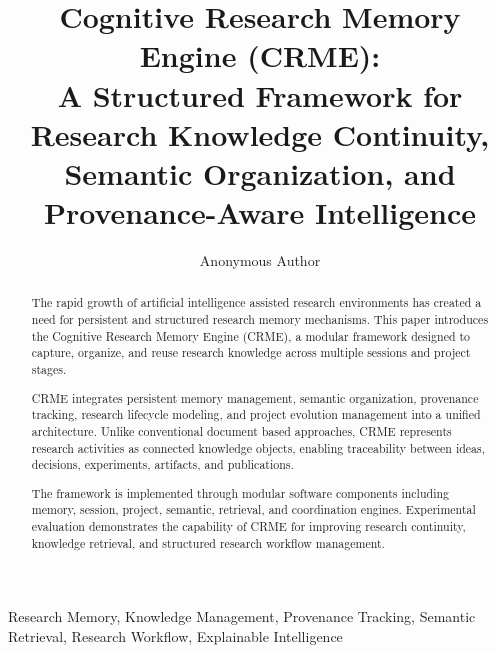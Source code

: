 \documentclass[conference]{IEEEtran}
\title{
Cognitive Research Memory Engine (CRME):\\
A Structured Framework for Research Knowledge Continuity,
Semantic Organization, and Provenance-Aware Intelligence
}
\author{
Anonymous Author
}
\begin{document}
\maketitle




\begin{abstract}

The rapid growth of artificial intelligence assisted research
environments has created a need for persistent and structured
research memory mechanisms. This paper introduces the Cognitive
Research Memory Engine (CRME), a modular framework designed to
capture, organize, and reuse research knowledge across multiple
sessions and project stages.

CRME integrates persistent memory management, semantic organization,
provenance tracking, research lifecycle modeling, and project evolution
management into a unified architecture. Unlike conventional document
based approaches, CRME represents research activities as connected
knowledge objects, enabling traceability between ideas, decisions,
experiments, artifacts, and publications.

The framework is implemented through modular software components
including memory, session, project, semantic, retrieval, and coordination
engines. Experimental evaluation demonstrates the capability of CRME
for improving research continuity, knowledge retrieval, and structured
research workflow management.

\end{abstract}




\begin{IEEEkeywords}

Research Memory,
Knowledge Management,
Provenance Tracking,
Semantic Retrieval,
Research Workflow,
Explainable Intelligence

\end{IEEEkeywords}






















\end{document}
